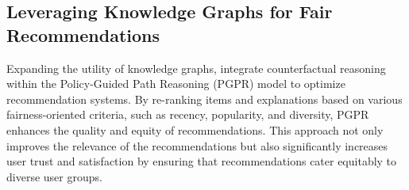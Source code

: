 \subsection{Leveraging Knowledge Graphs for Fair Recommendations}

Expanding the utility of knowledge graphs, \textcite{balloccu_post_2022} integrate counterfactual
reasoning within the Policy-Guided Path Reasoning (PGPR) model to optimize recommendation
systems. By re-ranking items and explanations based on various fairness-oriented
criteria, such as recency, popularity, and diversity, PGPR enhances the quality
and equity of recommendations. This approach not only improves the relevance of the
recommendations but also significantly increases user trust and satisfaction by ensuring
that recommendations cater equitably to diverse user groups.